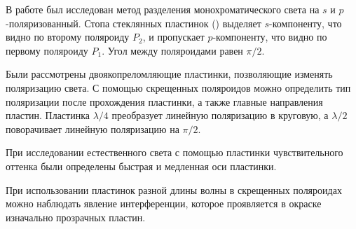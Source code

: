 \documentclass[a4paper, 12pt]{article}
\begin{document}
В работе был исследован метод разделения монохроматического света на
$s$ и $p$-поляризованный. Стопа стеклянных пластинок ()
выделяет $s$-компоненту, что видно по второму поляроиду $P_2$, и
пропускает $p$-компоненту, что видно по первому поляроиду $P_1$. Угол
между поляроидами равен $\pi/2$.

Были рассмотрены двоякопреломляющие пластинки, позволяющие изменять
поляризацию света. С помощью скрещенных поляроидов можно определить
тип поляризации после прохождения пластинки, а также главные
направления пластин. Пластинка $\lambda/4$
преобразует линейную
поляризацию в круговую, а $\lambda/2$ поворачивает линейную
поляризацию на $\pi/2$.

При исследовании естественного света с помощью пластинки
чувствительного оттенка были определены быстрая и медленная оси
пластинки.

При использовании пластинок разной длины волны в скрещенных
поляроидах можно наблюдать явление интерференции, которое проявляется
в окраске изначально прозрачных пластин.
\end{document}
